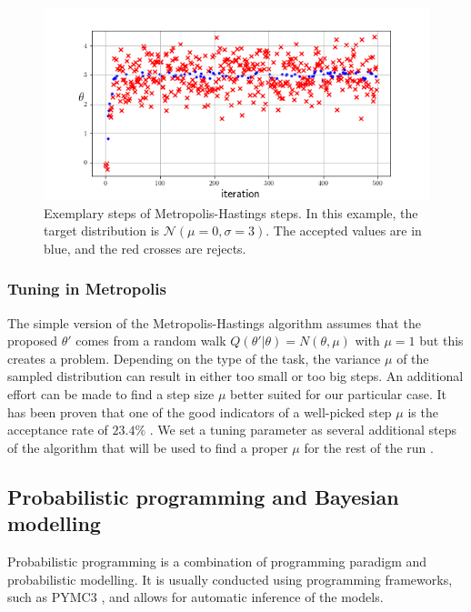 \begin{figure}
  \centering
  \includegraphics[width=0.9\linewidth]{figures/chapter3/random_walk.png}
  \caption{ Exemplary steps of Metropolis-Hastings steps. In this example, the target distribution is $\mathcal{N}(\mu=0, \sigma=3)$. The accepted values are in blue, and the red crosses are rejects.}
  \label{fig:random_walk}
\end{figure}


\subsubsection{Tuning in Metropolis}
\label{chap3:tuning_metropolis}

The simple version of the Metropolis-Hastings algorithm assumes that the proposed $\theta\prime$ comes from a random walk $Q(\theta'|\theta)=N(\theta, \mu)$ with $\mu=1$ but this creates a problem.
Depending on the type of the task, the variance $\mu$ of the sampled distribution can result in either too small or too big steps.
An additional effort can be made to find a step size $\mu$ better suited for our particular case.
It has been proven that one of the good indicators of a well-picked step $\mu$ is the acceptance rate of $23.4\%$ \cite{10.1214/aoap/1034625254}.
We set a tuning parameter as several additional steps of the algorithm that will be used to find a proper $\mu$ for the rest of the run \cite{colin_carroll_2019}.

\subsection{Probabilistic programming and Bayesian modelling}

Probabilistic programming is a combination of programming paradigm and probabilistic modelling.
It is usually conducted using programming frameworks, such as PYMC3 \cite{Salvatier2016}, and allows for automatic inference of the models.


